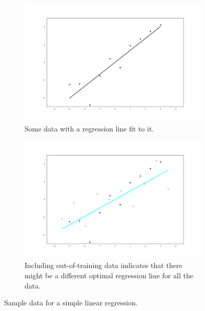 \documentclass[11pt, a4paper]{article}
\begin{document}
\begin{figure}[h]
	\centering
    \begin{subfigure}[b]{0.49\linewidth}
        \includegraphics[width=\linewidth]{lina.png}%
        \caption{Some data with a regression line fit to it.\newline\newline}
        \label{fig:lina}
    \end{subfigure}
    \begin{subfigure}[b]{0.49\linewidth}
        \includegraphics[width=\linewidth]{linb.png}%
        \caption{Including out-of-training data indicates that there might be a different optimal regression line for all the data.}
        \label{fig:linb}
    \end{subfigure}
    \label{fig:slr}
    \caption{Sample data for a simple linear regression.}
\end{figure}
\end{document}
